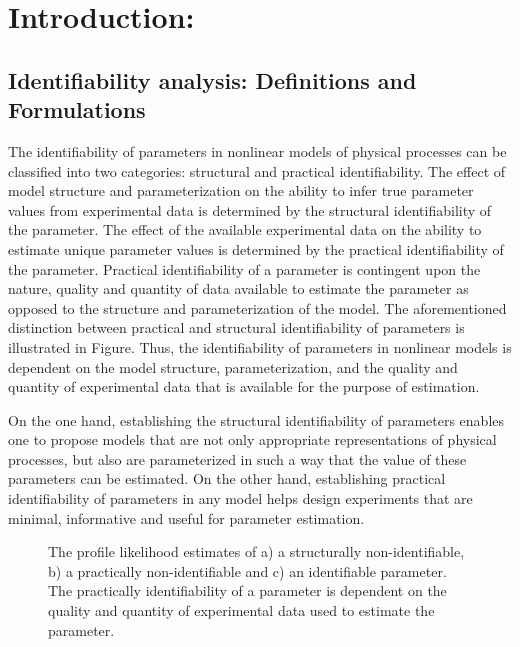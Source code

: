 \documentclass[10pt]{report}
\begin{document}
	\section{Introduction:}
	\subsection{Identifiability analysis: Definitions and Formulations}
	The identifiability of parameters in nonlinear models of physical processes can be classified into two categories: structural and practical identifiability. The effect of model structure and parameterization on the ability to infer true parameter values from experimental data is determined by the structural identifiability of the parameter. The effect of the available experimental data on the ability to estimate unique parameter values is determined by the practical identifiability of the parameter. Practical identifiability of a parameter is contingent upon the nature, quality and quantity of data available to estimate the parameter as opposed to the structure and parameterization of the model. The aforementioned distinction between practical and structural identifiability of parameters is illustrated in Figure. Thus, the identifiability of parameters in nonlinear models is dependent on the model structure, parameterization, and the quality and quantity of experimental data that is available for the purpose of estimation. 
	
	On the one hand, establishing the structural identifiability of parameters enables one to propose models that are not only appropriate representations of physical processes, but also are parameterized in such a way that the value of these parameters can be estimated. On the other hand, establishing practical identifiability of parameters in any model helps design experiments that are minimal, informative and useful for parameter estimation. 
	
	\begin{figure}[!tbhp]
		\caption{The profile likelihood estimates of a) a structurally non-identifiable, b) a practically non-identifiable and c) an identifiable parameter. The practically identifiability of a parameter is dependent on the quality and quantity of experimental data used to estimate the parameter.}\label{fig:ident-pl}
	\end{figure}
\end{document}
